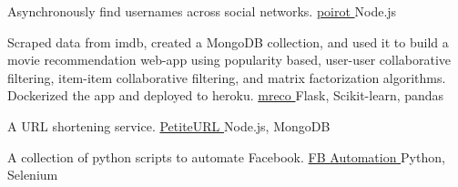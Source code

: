 \begin{cventries}

  \cventry
    {Asynchronously find usernames across social networks.} %
    {\href{https://github.com/rajdeepbharati/poirot}{poirot \ExternalLink}} %
    {Node.js} %
    {} %
    {}
    \vspace{-\baselineskip}

\begin{comment}
  \cventry
    {A music streaming and recommendation service.} %
    {\href{https://github.com/rajdeepbharati/Melodie}{Melodie \ExternalLink}} %
    {Django, Scikit-learn, pandas} %
    {} %
    {}
    \vspace{-\baselineskip}
\end{comment}
  \cventry
    {Scraped data from imdb, created a MongoDB collection, and used it to build a movie recommendation web-app using popularity based, user-user collaborative filtering, item-item collaborative filtering, and matrix factorization algorithms. Dockerized the app and deployed to heroku.} %
    {\href{https://gitlab.com/rajdeepbharati/reco-engine}{mreco \ExternalLink}} %
    {Flask, Scikit-learn, pandas} %
    {} %
    {}
    \vspace{-\baselineskip}
    
  \cventry
    {A URL shortening service.} %
    {\href{https://github.com/rajdeepbharati/PetiteURL}{PetiteURL \ExternalLink}} %
    {Node.js, MongoDB} %
    {} %
    {}
    \vspace{-\baselineskip}
    
  \cventry
    {A collection of python scripts to automate Facebook.} %
    {\href{https://github.com/rajdeepbharati/FB-Automation}{FB Automation \ExternalLink}} %
    {Python, Selenium} %
    {} %
    {}
    \vspace{-\baselineskip}


\end{cventries}

